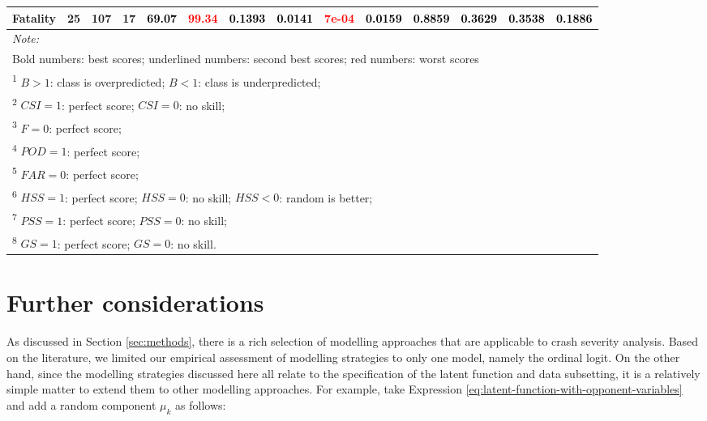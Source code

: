 \documentclass[]{elsarticle} %
\begin{document}
\begin{table}
{{\begin{tabular}[t]{lrrrllllllllll}
Fatality & 25 & 107 & 17 & \multirow{-3}{*}{\raggedright\arraybackslash \textcolor{black}{69.07}} & \textcolor{red}{99.34} & \textcolor{black}{\textbf{0.1393}} & \textcolor{black}{\textbf{0.0141}} & \textcolor{red}{7e-04} & \textcolor{black}{\textbf{0.0159}} & \textcolor{black}{0.8859} & \multirow{-3}{*}{\raggedright\arraybackslash \textcolor{black}{0.3629}} & \multirow{-3}{*}{\raggedright\arraybackslash \textcolor{black}{0.3538}} & \multirow{-3}{*}{\raggedright\arraybackslash \textcolor{black}{0.1886}}\\
\bottomrule
\multicolumn{14}{l}{\textit{Note: }}\\
\multicolumn{14}{l}{Bold numbers: best scores; underlined numbers: second best scores; red numbers: worst scores}\\
\multicolumn{14}{l}{\textsuperscript{1} $B>1$: class is overpredicted; $B<1$: class is underpredicted; }\\
\multicolumn{14}{l}{\textsuperscript{2} $CSI = 1$: perfect score; $CSI = 0$: no skill; }\\
\multicolumn{14}{l}{\textsuperscript{3} $F = 0$: perfect score; }\\
\multicolumn{14}{l}{\textsuperscript{4} $POD = 1$: perfect score; }\\
\multicolumn{14}{l}{\textsuperscript{5} $FAR = 0$: perfect score; }\\
\multicolumn{14}{l}{\textsuperscript{6} $HSS = 1$: perfect score; $HSS = 0$: no skill; $HSS < 0$: random is better; }\\
\multicolumn{14}{l}{\textsuperscript{7} $PSS = 1$: perfect score; $PSS = 0$: no skill; }\\
\multicolumn{14}{l}{\textsuperscript{8} $GS = 1$: perfect score; $GS = 0$: no skill.}\\
\end{tabular}}}
\end{table}

\hypertarget{sec:further-considerations}{%
\section{Further considerations}\label{sec:further-considerations}}

As discussed in Section \ref{sec:methods}, there is a rich selection of
modelling approaches that are applicable to crash severity analysis.
Based on the literature, we limited our empirical assessment of
modelling strategies to only one model, namely the ordinal logit. On the
other hand, since the modelling strategies discussed here all relate to
the specification of the latent function and data subsetting, it is a
relatively simple matter to extend them to other modelling approaches.
For example, take Expression
\ref{eq:latent-function-with-opponent-variables} and add a random
component \(\mu_{k}\) as follows:
\end{document}
